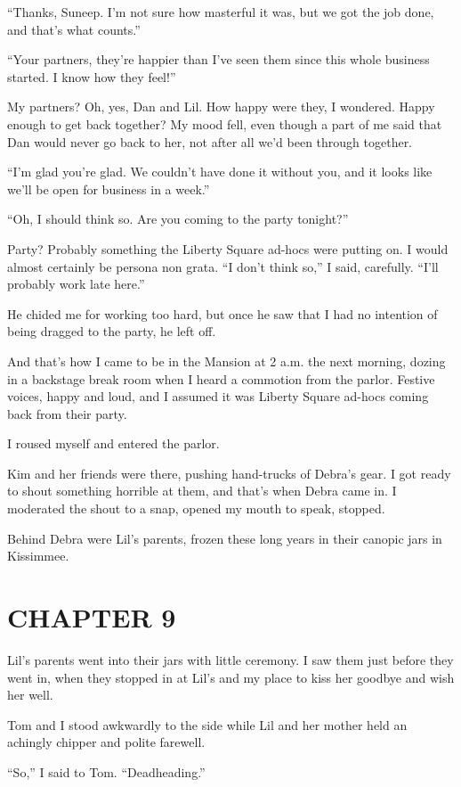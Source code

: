 “Thanks, Suneep. I'm not sure how masterful it was, but we got the
job done, and that's what counts.”

“Your partners, they're happier than I've seen them since this
whole business started. I know how they feel!”

My partners? Oh, yes, Dan and Lil. How happy were they, I wondered.
Happy enough to get back together? My mood fell, even though a part
of me said that Dan would never go back to her, not after all we'd
been through together.

“I'm glad you're glad. We couldn't have done it without you, and it
looks like we'll be open for business in a week.”

“Oh, I should think so. Are you coming to the party tonight?”

Party? Probably something the Liberty Square ad-hocs were putting
on. I would almost certainly be persona non grata. “I don't think
so,” I said, carefully. “I'll probably work late here.”

He chided me for working too hard, but once he saw that I had no
intention of being dragged to the party, he left off.

And that's how I came to be in the Mansion at 2 a.m. the next
morning, dozing in a backstage break room when I heard a commotion
from the parlor. Festive voices, happy and loud, and I assumed it
was Liberty Square ad-hocs coming back from their party.

I roused myself and entered the parlor.

Kim and her friends were there, pushing hand-trucks of Debra's
gear. I got ready to shout something horrible at them, and that's
when Debra came in. I moderated the shout to a snap, opened my
mouth to speak, stopped.

Behind Debra were Lil's parents, frozen these long years in their
canopic jars in Kissimmee.

\section{CHAPTER 9}

Lil's parents went into their jars with little ceremony. I saw them
just before they went in, when they stopped in at Lil's and my
place to kiss her goodbye and wish her well.

Tom and I stood awkwardly to the side while Lil and her mother held
an achingly chipper and polite farewell.

“So,” I said to Tom. “Deadheading.”


